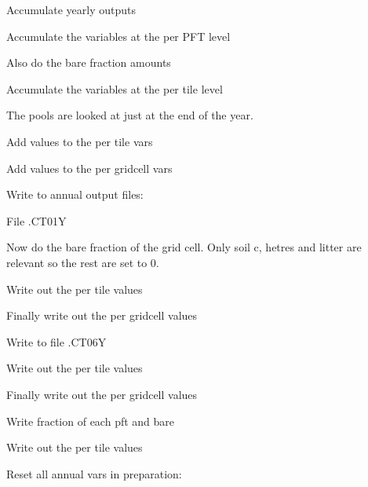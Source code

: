 Accumulate yearly outputs

Accumulate the variables at the per P\+F\+T level

Also do the bare fraction amounts

Accumulate the variables at the per tile level

The pools are looked at just at the end of the year.

Add values to the per tile vars

Add values to the per gridcell vars

Write to annual output files\+:

File .C\+T01\+Y

Now do the bare fraction of the grid cell. Only soil c, hetres and litter are relevant so the rest are set to 0.

Write out the per tile values

Finally write out the per gridcell values

Write to file .C\+T06\+Y

Write out the per tile values

Finally write out the per gridcell values

Write fraction of each pft and bare

Write out the per tile values

Reset all annual vars in preparation\+: 